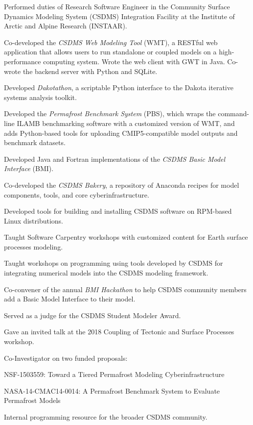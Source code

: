 \documentclass[letterpaper]{resume}
\begin{document}
\begin{compactitem}[\itembullet]
  \item
    Performed duties of Research Software Engineer in the Community
    Surface Dynamics Modeling System (CSDMS) Integration Facility at
    the Institute of Arctic and Alpine Research (INSTAAR).
  \item
    Co-developed the \textit{CSDMS Web Modeling Tool} (WMT), a RESTful
    web application that allows users to run standalone or coupled
    models on a high-performance computing system. Wrote the web
    client with GWT in Java. Co-wrote the backend server with Python
    and SQLite.
  \item
    Developed \textit{Dakotathon}, a scriptable Python interface to
    the Dakota iterative systems analysis toolkit.
  \item    
    Developed the \textit{Permafrost Benchmark System} (PBS), which
    wraps the command-line ILAMB benchmarking software with a
    customized version of WMT, and adds Python-based tools for
    uploading CMIP5-compatible model outputs and benchmark datasets.
  \item
    Developed Java and Fortran implementations of the \textit{CSDMS
      Basic Model Interface} (BMI).
  \item
    Co-developed the \textit{CSDMS Bakery}, a repository of Anaconda recipes
    for model components, tools, and core cyberinfrastructure.
  \item
    Developed tools for building and installing CSDMS software on
    RPM-based Linux distributions.
  \item
    Taught Software Carpentry workshops with customized content for
    Earth surface processes modeling.
  \item
    Taught workshops on programming using tools developed by CSDMS for
    integrating numerical models into the CSDMS modeling framework.
  \item
    Co-convener of the annual \textit{BMI Hackathon} to help CSDMS
    community members add a Basic Model Interface to their model.
  \item
    Served as a judge for the CSDMS Student Modeler Award.
  \item
    Gave an invited talk at the 2018 Coupling of Tectonic and Surface
    Processes workshop.
  \item Co-Investigator on two funded proposals:
    \begin{compactitem}[\itembullet]
      \item
        NSF-1503559: Toward a Tiered Permafrost Modeling Cyberinfrastructure
      \item
        NASA-14-CMAC14-0014: A Permafrost Benchmark System to Evaluate
        Permafrost Models
    \end{compactitem}
  \item Internal programming resource for the broader CSDMS community.
\end{compactitem}
\end{document}
